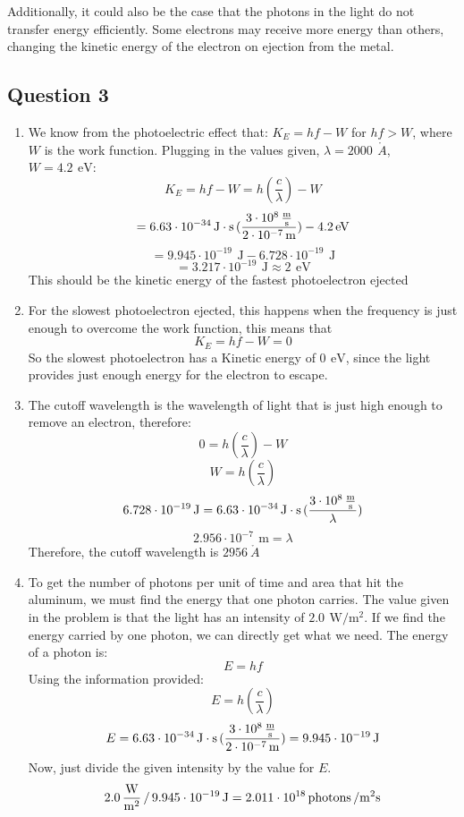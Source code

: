 \documentclass{article}
\begin{document}
Additionally, it could also be the case that the photons in the light do not transfer energy efficiently. Some electrons may receive more energy than others, changing the kinetic energy of the electron on ejection from the metal.
\subsection*{Question 3}
\begin{enumerate}[label=\alph*)]
\item
We know from the photoelectric effect that: $K_E=hf-W$ for $hf > W$, where $W$ is the work function. Plugging in the values given, $\lambda=2000\,\SI{}{\mathring{A}}$, $W = 4.2\,\SI{}{\electronvolt}$:
\[K_E=hf-W=h(\frac{c}{\lambda}) - W\]
\[=6.63\cdot10^{-34}\,\SI{}{\joule\cdot\second}\,(\frac{3\cdot10^8\,\SI{}{\frac{\meter}{\second}}}{2\cdot10^{-7}\,\SI{}{\meter}}) - 4.2\,\SI{}{\electronvolt}\]
\[=9.945\cdot10^{-19}\,\SI{}{\joule} - 6.728\cdot10^{-19}\,\SI{}{\joule}\]
\[=3.217\cdot10^{-19}\,\SI{}{\joule}\approx2\,\SI{}{\electronvolt}\]
This should be the kinetic energy of the fastest photoelectron ejected
\item
For the slowest photoelectron ejected, this happens when the frequency is just enough to overcome the work function, this means that
\[K_E=hf-W=0\]
So the slowest photoelectron has a Kinetic energy of $0\,\SI{}{\electronvolt}$, since the light provides just enough energy for the electron to escape.
\item
The cutoff wavelength is the wavelength of light that is just high enough to remove an electron, therefore:
\[0=h(\frac{c}{\lambda}) - W\]
\[W=h(\frac{c}{\lambda})\]
\[6.728\cdot10^{-19}\,\SI{}{\joule}=6.63\cdot10^{-34}\,\SI{}{\joule\cdot\second}\,(\frac{3\cdot10^8\,\SI{}{\frac{\meter}{\second}}}{\lambda})\]
\[2.956\cdot10^{-7}\,\SI{}{\meter}=\lambda\]
Therefore, the cutoff wavelength is $2956\SI{}{\mathring{A}}$
\item
To get the number of photons per unit of time and area that hit the aluminum, we must find the energy that one photon carries. The value given in the problem is that the light has an intensity of $2.0\,\SI{}{\watt/\meter^2}$. If we find the energy carried by one photon, we can directly get what we need.
The energy of a photon is:
\[E=hf\]
Using the information provided:
\[E=h(\frac{c}{\lambda})\]
\[E=6.63\cdot10^{-34}\,\SI{}{\joule\cdot\second}\,(\frac{3\cdot10^8\,\SI{}{\frac{\meter}{\second}}}{2\cdot10^{-7}\,\SI{}{\meter}})=9.945\cdot10^{-19}\,\SI{}{\joule}\]
Now, just divide the given intensity by the value for $E$.
\[2.0\,\SI{}{\frac{\watt}{\meter^2}}\,/\,9.945\cdot10^{-19}\,\SI{}{\joule}=2.011\cdot10^{18}\,{\textnormal{photons}}\,/\SI{}{\meter^2\second}\]
\end{enumerate}
\end{document}
